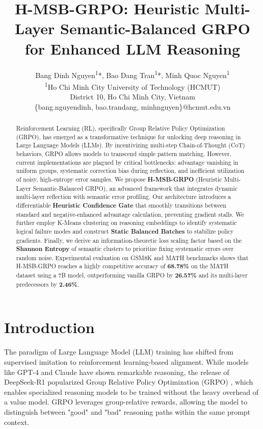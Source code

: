 \documentclass[letterpaper]{article}
\title{H-MSB-GRPO: Heuristic Multi-Layer Semantic-Balanced GRPO \\ for Enhanced LLM Reasoning}
\author{Bang Dinh Nguyen\textsuperscript{1}*, Bao Dang Tran\textsuperscript{1}*, Minh Quoc Nguyen\textsuperscript{1}\dag\\
\textsuperscript{1}Ho Chi Minh City University of Technology (HCMUT)\\
District 10, Ho Chi Minh City, Vietnam\\
\{bang.nguyendinh, bao.trandang, minhnguyen\}@hcmut.edu.vn
}
\begin{document}
\maketitle

\def\thefootnote{*}
\def\thefootnote{\dag}
\def\thefootnote{\arabic{footnote}}

\begin{abstract}
Reinforcement Learning (RL), specifically Group Relative Policy Optimization (GRPO), has emerged as a transformative technique for unlocking deep reasoning in Large Language Models (LLMs). By incentivizing multi-step Chain-of-Thought (CoT) behaviors, GRPO allows models to transcend simple pattern matching. However, current implementations are plagued by critical bottlenecks: advantage vanishing in uniform groups, systematic correction bias during reflection, and inefficient utilization of noisy, high-entropy error samples. We propose \textbf{H-MSB-GRPO} (Heuristic Multi-Layer Semantic-Balanced GRPO), an advanced framework that integrates dynamic multi-layer reflection with semantic error profiling. Our architecture introduces a differentiable \textbf{Heuristic Confidence Gate} that smoothly transitions between standard and negative-enhanced advantage calculation, preventing gradient stalls. We further employ K-Means clustering on reasoning embeddings to identify systematic logical failure modes and construct \textbf{Static Balanced Batches} to stabilize policy gradients. Finally, we derive an information-theoretic loss scaling factor based on the \textbf{Shannon Entropy} of semantic clusters to prioritize fixing systematic errors over random noise. Experimental evaluation on GSM8K and MATH benchmarks shows that H-MSB-GRPO reaches a highly competitive accuracy of \textbf{68.78\%} on the MATH dataset using a 7B model, outperforming vanilla GRPO by \textbf{26.57\%} and its multi-layer predecessors by \textbf{2.46\%}.
\end{abstract}

\section{Introduction}

The paradigm of Large Language Model (LLM) training has shifted from supervised imitation to reinforcement learning-based alignment. While models like GPT-4 and Claude have shown remarkable reasoning, the release of DeepSeek-R1 popularized Group Relative Policy Optimization (GRPO) \cite{deepseekmath}, which enables specialized reasoning models to be trained without the heavy overhead of a value model. GRPO leverages group-relative rewards, allowing the model to distinguish between "good" and "bad" reasoning paths within the same prompt context.
\end{document}
